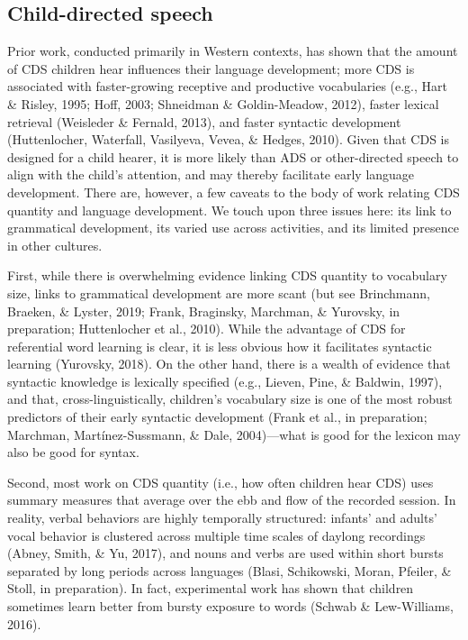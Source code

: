 \documentclass[floatsintext,man]{apa6}
\theoremstyle{definition}
\theoremstyle{definition}
\theoremstyle{definition}
\theoremstyle{remark}
\begin{document}
\subsection{Child-directed speech}\label{intro-cds}

Prior work, conducted primarily in Western contexts, has shown that the
amount of CDS children hear influences their language development; more
CDS is associated with faster-growing receptive and productive
vocabularies (e.g., Hart \& Risley, 1995; Hoff, 2003; Shneidman \&
Goldin-Meadow, 2012), faster lexical retrieval (Weisleder \& Fernald,
2013), and faster syntactic development (Huttenlocher, Waterfall,
Vasilyeva, Vevea, \& Hedges, 2010). Given that CDS is designed for a
child hearer, it is more likely than ADS or other-directed speech to
align with the child's attention, and may thereby facilitate early
language development. There are, however, a few caveats to the body of
work relating CDS quantity and language development. We touch upon three
issues here: its link to grammatical development, its varied use across
activities, and its limited presence in other cultures.

First, while there is overwhelming evidence linking CDS quantity to
vocabulary size, links to grammatical development are more scant (but
see Brinchmann, Braeken, \& Lyster, 2019; Frank, Braginsky, Marchman, \&
Yurovsky, in preparation; Huttenlocher et al., 2010). While the
advantage of CDS for referential word learning is clear, it is less
obvious how it facilitates syntactic learning (Yurovsky, 2018). On the
other hand, there is a wealth of evidence that syntactic knowledge is
lexically specified (e.g., Lieven, Pine, \& Baldwin, 1997), and that,
cross-linguistically, children's vocabulary size is one of the most
robust predictors of their early syntactic development (Frank et al., in
preparation; Marchman, Martínez-Sussmann, \& Dale, 2004)---what is good
for the lexicon may also be good for syntax.

Second, most work on CDS quantity (i.e., how often children hear CDS)
uses summary measures that average over the ebb and flow of the recorded
session. In reality, verbal behaviors are highly temporally structured:
infants' and adults' vocal behavior is clustered across multiple time
scales of daylong recordings (Abney, Smith, \& Yu, 2017), and nouns and
verbs are used within short bursts separated by long periods across
languages (Blasi, Schikowski, Moran, Pfeiler, \& Stoll, in preparation).
In fact, experimental work has shown that children sometimes learn
better from bursty exposure to words (Schwab \& Lew-Williams, 2016).
\end{document}
